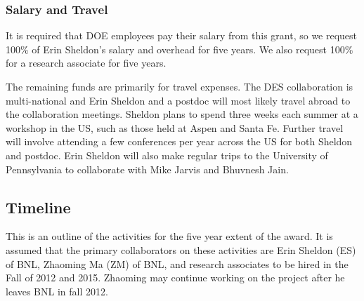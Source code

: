 \documentclass[12pt]{article}
\begin{document}


\subsubsection{Salary and Travel}

It is required that DOE employees pay their salary from this grant, so
we request 100\% of Erin Sheldon's salary and overhead for five years. We
also request 100\% for a research associate for five years.

The remaining funds are primarily for travel expenses.   The DES collaboration
is multi-national and Erin Sheldon and a postdoc will most likely travel abroad
to the collaboration meetings.  Sheldon plans to spend three weeks each summer
at a workshop in the US, such as those held at Aspen and Santa Fe.  Further
travel will involve attending a few conferences per year across the US for both
Sheldon and postdoc.  Erin Sheldon will also make regular trips to the
University of Pennsylvania to collaborate with Mike Jarvis and Bhuvnesh Jain.

\clearpage
\newpage
\subsection{Timeline}

This is an outline of the activities for the five year extent of the award.  It
is assumed that the primary collaborators on these activities are Erin Sheldon
(ES) of BNL, Zhaoming Ma (ZM) of BNL, and research associates to be hired in
the Fall of 2012 and 2015.  Zhaoming may continue working on the project after
he leaves BNL in fall 2012.
\end{document}
